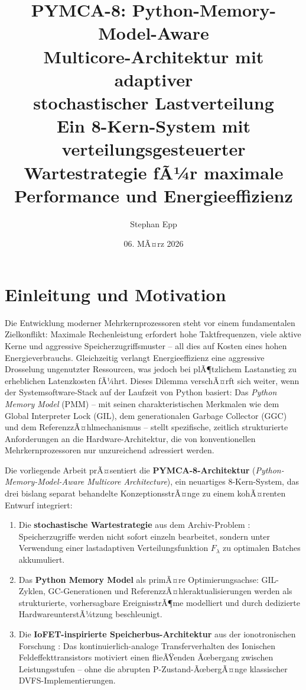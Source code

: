 ﻿\documentclass[a4paper,12pt]{scrreprt}
\title{\textbf{PYMCA-8: Python-Memory-Model-Aware\\
		Multicore-Architektur mit adaptiver\\
		stochastischer Lastverteilung}\\[0.5em]
	\large Ein 8-Kern-System mit verteilungsgesteuerter\\
	Wartestrategie fÃ¼r maximale Performance und Energieeffizienz}
\author{Stephan Epp}
\date{06. MÃ¤rz 2026}
\theoremstyle{definition}
\begin{document}
	
	\maketitle
	\tableofcontents
	\newpage
	
	\section{Einleitung und Motivation}
	
	Die Entwicklung moderner Mehrkernprozessoren steht vor einem fundamentalen
	Zielkonflikt: Maximale Rechenleistung erfordert hohe Taktfrequenzen, viele
	aktive Kerne und aggressive Speicherzugriffsmuster -- all dies auf Kosten
	eines hohen Energieverbrauchs. Gleichzeitig verlangt Energieeffizienz eine
	aggressive Drosselung ungenutzter Ressourcen, was jedoch bei plÃ¶tzlichem
	Lastanstieg zu erheblichen Latenzkosten fÃ¼hrt. Dieses Dilemma verschÃ¤rft sich
	weiter, wenn der Systemsoftware-Stack auf der Laufzeit von Python basiert:
	Das \emph{Python Memory Model} (PMM) -- mit seinen charakteristischen
	Merkmalen wie dem Global Interpreter Lock (GIL), dem generationalen
	Garbage Collector (GGC) und dem ReferenzzÃ¤hlmechanismus -- stellt
	spezifische, zeitlich strukturierte Anforderungen an die Hardware-Architektur,
	die von konventionellen Mehrkernprozessoren nur unzureichend adressiert werden.
	
	Die vorliegende Arbeit prÃ¤sentiert die \textbf{PYMCA-8-Architektur}
	(\emph{Python-Memory-Model-Aware Multicore Architecture}), ein neuartiges
	8-Kern-System, das drei bislang separat behandelte KonzeptionsstrÃ¤nge
	zu einem kohÃ¤renten Entwurf integriert:
	
	\begin{enumerate}[noitemsep]
		\item Die \textbf{stochastische Wartestrategie} aus dem Archiv-Problem
		\cite{epp2026archiv}: Speicherzugriffe werden nicht sofort einzeln
		bearbeitet, sondern unter Verwendung einer lastadaptiven
		Verteilungsfunktion $F_\lambda$ zu optimalen Batches akkumuliert.
		\item Das \textbf{Python Memory Model} als primÃ¤re Optimierungsachse:
		GIL-Zyklen, GC-Generationen und ReferenzzÃ¤hleraktualisierungen
		werden als strukturierte, vorhersagbare EreignisstrÃ¶me modelliert
		und durch dedizierte HardwareunterstÃ¼tzung beschleunigt.
		\item Die \textbf{IoFET-inspirierte Speicherbus-Architektur} aus der
		ionotronischen Forschung \cite{epp2026iono}: Das kontinuierlich-analoge
		Transferverhalten des Ionischen Feldeffekttransistors motiviert
		einen flieÃŸenden Ãœbergang zwischen Leistungsstufen -- ohne die
		abrupten P-Zustand-ÃœbergÃ¤nge klassischer DVFS-Implementierungen.
	\end{enumerate}
	
\end{document}
